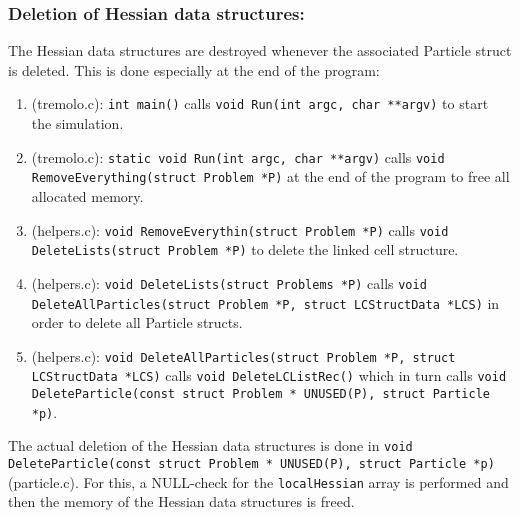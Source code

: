 \documentclass[11pt]{article}
\begin{document}
\subsubsection{Deletion of Hessian data structures:}
\label{sec-1-1-4}
The Hessian data structures are destroyed whenever the associated Particle struct is deleted. This is done especially at the end of the program:
\begin{enumerate}
\item (tremolo.c): \texttt{int main()} calls \texttt{void Run(int argc, char **argv)} to start the simulation.
\item (tremolo.c): \texttt{static void Run(int argc, char **argv)} calls \texttt{void RemoveEverything(struct Problem *P)} at the end of the program to free all allocated memory.
\item (helpers.c): \texttt{void RemoveEverythin(struct Problem *P)} calls \texttt{void DeleteLists(struct Problem *P)} to delete the linked cell structure.
\item (helpers.c): \texttt{void DeleteLists(struct Problems *P)} calls \texttt{void DeleteAllParticles(struct Problem *P, struct LCStructData *LCS)} in order to delete all Particle structs.
\item (helpers.c): \texttt{void DeleteAllParticles(struct Problem *P, struct LCStructData *LCS)} calls \texttt{void DeleteLCListRec()} which in turn calls \texttt{void DeleteParticle(const struct Problem * UNUSED(P), struct Particle *p)}.
\end{enumerate}
The actual deletion of the Hessian data structures is done in \texttt{void DeleteParticle(const struct Problem * UNUSED(P), struct Particle *p)} (particle.c). For this, a NULL-check for the \texttt{localHessian} array is performed and then the memory of the Hessian data structures is freed.
\end{document}
